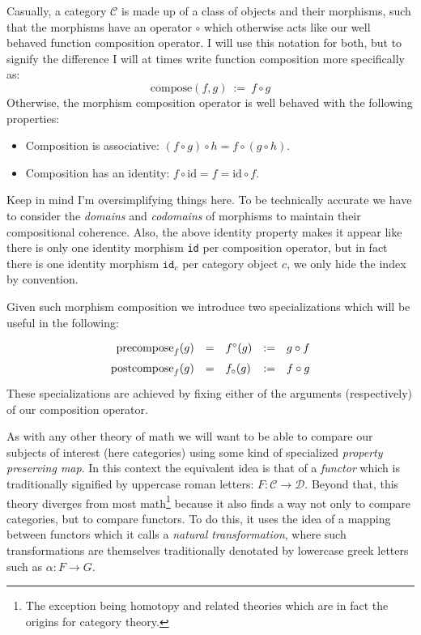 \documentclass[twoside]{article}
\newcommand{\defeq}{\ensuremath{\ :=\ }}
\newcommand{\id}{\mbox{id}}
\newcommand{\compose}{\mbox{compose}}
\newcommand{\precompose}[1]{\ensuremath{\mbox{precompose}_{#1}}}
\newcommand{\postcompose}[1]{\ensuremath{\mbox{postcompose}_{#1}}}
\begin{document}
Casually, a category $ \mathcal{C} $ is made up of a class of objects and their morphisms, such that the morphisms have
an operator $ \circ $ which otherwise acts like our well behaved function composition operator. I will use this notation
for both, but to signify the difference I will at times write function composition more specifically as:
$$ \compose(f, g) \defeq f \circ g $$
Otherwise, the morphism composition operator is well behaved with the following properties:

\begin{itemize}
\item Composition is associative: $ (f \circ g) \circ h = f \circ (g \circ h) $.
\item Composition has an identity: $ f \circ \id = f = \id \circ f $.
\end{itemize}
Keep in mind I'm oversimplifying things here. To be technically accurate we have to consider the \emph{domains}
and \emph{codomains} of morphisms to maintain their compositional coherence. Also, the above identity property
makes it appear like there is only one identity morphism \texttt{id} per composition operator, but in fact there
is one identity morphism $ \texttt{id}_c $ per category object $ c $, we only hide the index by convention.

Given such morphism composition we introduce two specializations which will be useful in the following:
$$ \def\arraystretch{1.5}
\begin{array}{rclcl}
\precompose{f}(g)	& = & f^\circ(g)	& := & g \circ f		\\
\postcompose{f}(g)	& = & f_\circ(g)	& := & f \circ g
\end{array} $$
These specializations are achieved by fixing either of the arguments (respectively) of our composition operator.

As with any other theory of math we will want to be able to compare our subjects of interest (here categories) using
some kind of specialized \emph{property preserving map}. In this context the equivalent idea is that of a \emph{functor}
which is traditionally signified by uppercase roman letters: $ F:\mathcal{C}\to\mathcal{D} $. Beyond that, this theory
diverges from most math\footnote{The exception being homotopy and related theories which are in fact the origins for
category theory.} because it also finds a way not only to compare categories, but to compare functors. To do this,
it uses the idea of a mapping between functors which it calls a \emph{natural transformation}, where such transformations
are themselves traditionally denotated by lowercase greek letters such as $ \alpha:F\to G $.
\end{document}
